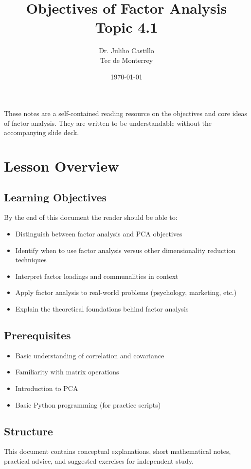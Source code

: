 \documentclass[a4paper,11pt]{tufte-book}
\title{Objectives of Factor Analysis\\\large Topic 4.1}
\author{Dr. Juliho Castillo\\Tec de Monterrey}
\date{\today}
\begin{document}
\maketitle

These notes are a self-contained reading resource on the objectives and core ideas of factor analysis. They are written to be understandable without the accompanying slide deck.

\tableofcontents
\newpage

\section{Lesson Overview}

\subsection{Learning Objectives}
By the end of this document the reader should be able to:
\begin{itemize}
  \item Distinguish between factor analysis and PCA objectives
  \item Identify when to use factor analysis versus other dimensionality reduction techniques
  \item Interpret factor loadings and communalities in context
  \item Apply factor analysis to real-world problems (psychology, marketing, etc.)
  \item Explain the theoretical foundations behind factor analysis
\end{itemize}

\subsection{Prerequisites}
\begin{itemize}
  \item Basic understanding of correlation and covariance
  \item Familiarity with matrix operations
  \item Introduction to PCA
  \item Basic Python programming (for practice scripts)
\end{itemize}

\subsection{Structure}
This document contains conceptual explanations, short mathematical notes, practical advice, and suggested exercises for independent study.
\end{document}

